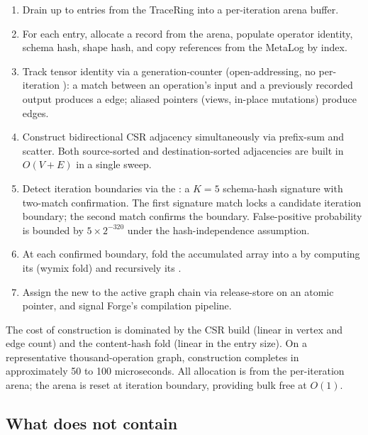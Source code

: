 \begin{enumerate}
  \item Drain up to  entries from the TraceRing into a per-iteration arena buffer.
  \item For each entry, allocate a  record from the arena, populate operator identity, schema hash, shape hash, and copy  references from the MetaLog by index.
  \item Track tensor identity via a generation-counter  (open-addressing, no per-iteration ): a match between an operation's input  and a previously recorded output  produces a  edge; aliased pointers (views, in-place mutations) produce  edges.
  \item Construct bidirectional CSR adjacency simultaneously via prefix-sum and scatter.
        Both source-sorted and destination-sorted adjacencies are built in $O(V{+}E)$ in a single sweep.
  \item Detect iteration boundaries via the : a $K{=}5$ schema-hash signature with two-match confirmation.
        The first signature match locks a candidate iteration boundary; the second match confirms the boundary.
        False-positive probability is bounded by $5 \times 2^{-320}$ under the hash-independence assumption.
  \item At each confirmed boundary, fold the accumulated  array into a  by computing its  (wymix fold) and recursively its .
  \item Assign the new  to the active graph chain via release-store on an atomic pointer, and signal Forge's compilation pipeline.
\end{enumerate}

The cost of construction is dominated by the CSR build (linear in vertex and edge count) and the content-hash fold (linear in the entry size).
On a representative thousand-operation graph,  construction completes in approximately 50 to 100 microseconds.
All allocation is from the per-iteration arena; the arena is reset at iteration boundary, providing bulk free at $O(1)$.

\subsection{What  does not contain}
\label{sec:ir001-not}

